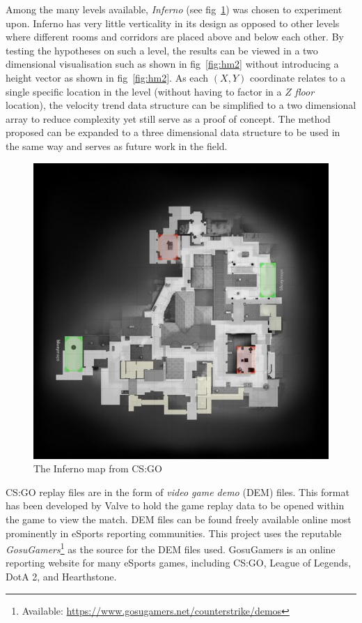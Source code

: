 \documentclass[journal]{IEEEtran}
\begin{document}
Among the many levels available, \textit{Inferno} (see fig~\ref{fig:inferno}) was chosen to experiment upon. Inferno has very little verticality in its design as opposed to other levels where different rooms and corridors are placed above and below each other. By testing the hypotheses on such a level, the results can be viewed in a two dimensional visualisation such as shown in fig~\ref{fig:hm2} without introducing a height vector as shown in fig~\ref{fig:hm2}. As each $(X, Y)$ coordinate relates to a single specific location in the level (without having to factor in a $Z$ \textit{floor} location), the velocity trend data structure can be simplified to a two dimensional array to reduce complexity yet still serve as a proof of concept. The method proposed can be expanded to a three dimensional data structure to be used in the same way and serves as future work in the field.

\begin{figure}[h]
    \centering
    \includegraphics[width=1.0\linewidth]{_InfernoMapImage.jpg}
    \caption{The Inferno map from CS:GO}
    \label{fig:inferno}
\end{figure}

CS:GO replay files are in the form of \textit{video game demo} (DEM) files. This format has been developed by Valve to hold the game replay data to be opened within the game to view the match. DEM files can be found freely available online most prominently in eSports reporting communities. This project uses the reputable \textit{GosuGamers}\footnote[2]{Available: \url{https://www.gosugamers.net/counterstrike/demos}} as the source for the DEM files used. GosuGamers is an online reporting website for many eSports games, including CS:GO, League of Legends, DotA 2, and Hearthstone.
\end{document}
